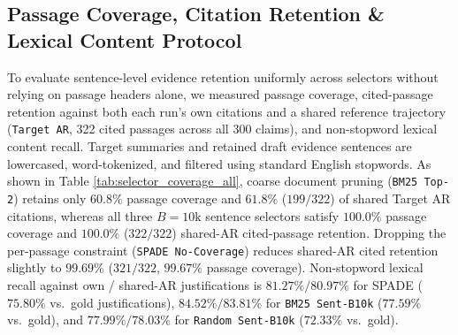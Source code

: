 \documentclass[11pt]{article}
\begin{document}
\begin{table}[ht]
\centering
\small
{}
\caption{\textbf{Verdict Classification Distribution across 300 Claims (\texttt{Qwen3-8B/0.6B}):} All Qwen3 arms achieve 100.0\% strict JSON validity and 100.0\% citation attribution fidelity.}
\label{tab:verdict_distribution}
\end{table}




\subsection{Passage Coverage, Citation Retention \& Lexical Content Protocol}
To evaluate sentence-level evidence retention uniformly across selectors without relying on passage headers alone, we measured passage coverage, cited-passage retention against both each run's own citations and a shared reference trajectory (\texttt{Target AR}, 322 cited passages across all 300 claims), and non-stopword lexical content recall. Target summaries and retained draft evidence sentences are lowercased, word-tokenized, and filtered using standard English stopwords. As shown in Table \ref{tab:selector_coverage_all}, coarse document pruning (\texttt{BM25 Top-2}) retains only $60.8\%$ passage coverage and $61.8\%$ ($199/322$) of shared Target AR citations, whereas all three $B=10\text{k}$ sentence selectors satisfy $100.0\%$ passage coverage and $100.0\%$ ($322/322$) shared-AR cited-passage retention. Dropping the per-passage constraint (\texttt{SPADE No-Coverage}) reduces shared-AR cited retention slightly to $99.69\%$ ($321/322$, $99.67\%$ passage coverage). Non-stopword lexical recall against own / shared-AR justifications is $81.27\% / 80.97\%$ for SPADE ($75.80\%$ vs.\ gold justifications), $84.52\% / 83.81\%$ for \texttt{BM25 Sent-B10k} ($77.59\%$ vs.\ gold), and $77.99\% / 78.03\%$ for \texttt{Random Sent-B10k} ($72.33\%$ vs.\ gold).
\end{document}

